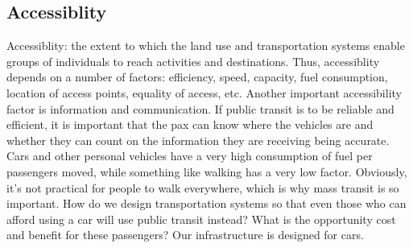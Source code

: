 \documentclass{article}
\begin{document}
    \subsection{Accessiblity}
    \begin{outline}
        \1 Accessiblity: the extent to which the land use and transportation systems enable groups of individuals to reach activities and destinations. 
        \1 Thus, accessiblity depends on a number of factors: efficiency, speed, capacity, fuel consumption, location of access points, equality of access, etc. 
        \1 Another important accessibility factor is information and communication. If public transit is to be reliable and efficient, it is important that the pax can know where the vehicles are and whether they can count on the information they are receiving being accurate. 
        \1 Cars and other personal vehicles have a very high consumption of fuel per passengers moved, while something like walking has a very low factor. Obviously, it's not practical for people to walk everywhere, which is why mass transit is so important. 
        \1 How do we design transportation systems so that even those who can afford using a car will use public transit instead? What is the opportunity cost and benefit for these passengers?
        \1 Our infrastructure is designed for cars. 
    \end{outline}
\end{document}
